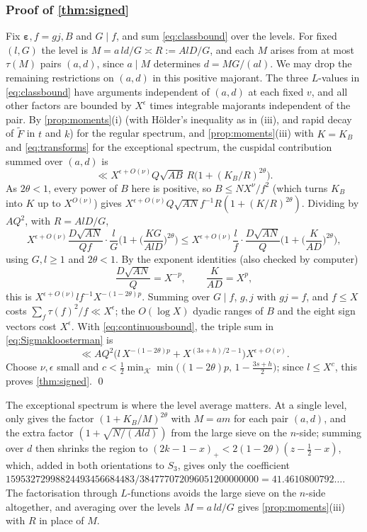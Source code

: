 \documentclass[11pt,colorlinks]{charlie}
\begin{document}
\subsubsection{Proof of \texorpdfstring{\cref{thm:signed}}{the signed estimate}}
Fix $\boldsymbol\varepsilon,f=gj,B$ and $G\mid f$, and sum \eqref{eq:classbound} over the levels. For fixed $(l,G)$ the level is $M=a\,ld/G\asymp R:=AlD/G$, and each $M$ arises from at most $\tau(M)$ pairs $(a,d)$, since $a\mid M$ determines $d=MG/(al)$. We may drop the remaining restrictions on $(a,d)$ in this positive majorant. The three $L$-values in \eqref{eq:classbound} have arguments independent of $(a,d)$ at each fixed $v$, and all other factors are bounded by $X^\epsilon$ times integrable majorants independent of the pair. By \cref{prop:moments}(i) (with H\"older's inequality as in (iii), and rapid decay of $\widetilde F$ in $t$ and $k$) for the regular spectrum, and \cref{prop:moments}(iii) with $K=K_B$ and \eqref{eq:transforms} for the exceptional spectrum, the cuspidal contribution summed over $(a,d)$ is
\[
 \ll X^{\epsilon+O(\nu)}Q\sqrt{AB}\,R\big(1+(K_B/R)^{2\theta}\big).
\]
As $2\theta<1$, every power of $B$ here is positive, so $B\le NX^\nu/f^2$ (which turns $K_B$ into $K$ up to $X^{O(\nu)}$) gives $X^{\epsilon+O(\nu)}Q\sqrt{AN}f^{-1}R(1+(K/R)^{2\theta})$. Dividing by $AQ^2$, with $R=AlD/G$,
\[
 X^{\epsilon+O(\nu)}\frac{D\sqrt{AN}}{Qf}\cdot\frac lG\Big(1+\Big(\frac{KG}{AlD}\Big)^{2\theta}\Big)\le X^{\epsilon+O(\nu)}\frac{l}{f}\cdot\frac{D\sqrt{AN}}Q\Big(1+\Big(\frac K{AD}\Big)^{2\theta}\Big),
\]
using $G,l\ge1$ and $2\theta<1$. By the exponent identities (also checked by computer)
\[
 \frac{D\sqrt{AN}}Q=X^{-p},\qquad\frac K{AD}=X^{p},
\]
this is $X^{\epsilon+O(\nu)}l f^{-1}X^{-(1-2\theta)p}$. Summing over $G\mid f$, $g,j$ with $gj=f$, and $f\le X$ costs $\sum_f\tau(f)^2/f\ll X^\epsilon$; the $O(\log X)$ dyadic ranges of $B$ and the eight sign vectors cost $X^\epsilon$. With \eqref{eq:continuousbound}, the triple sum in \eqref{eq:Sigmakloosterman} is
\[
 \ll AQ^2\big(l\,X^{-(1-2\theta)p}+X^{(3s+h)/2-1}\big)X^{\epsilon+O(\nu)} .
\]
Choose $\nu,\epsilon$ small and $c<\frac12\min_{\mathcal K}\min\big((1-2\theta)p,\,1-\frac{3s+h}2\big)$; since $l\le X^c$, this proves \cref{thm:signed}. \qed

\begin{remark}
The exceptional spectrum is where the level average matters. At a single level, \cite[Lemma~3.8]{Pascadi} only gives the factor $(1+K_B/M)^{2\theta}$ with $M=am$ for each pair $(a,d)$, and the extra factor $(1+\sqrt{N/(Ald)})$ from the large sieve on the $n$-side; summing over $d$ then shrinks the region to $(2k-1-x)_+<2(1-2\theta)(z-\frac12-x)$, which, added in both orientations to $S_3$, gives only the coefficient $15953272998824493456684483/384777072096051200000000=41.4610800792\ldots$. The factorisation through $L$-functions avoids the large sieve on the $n$-side altogether, and averaging over the levels $M=a\,ld/G$ gives \cref{prop:moments}(iii) with $R$ in place of $M$.
\end{remark}
\end{document}
